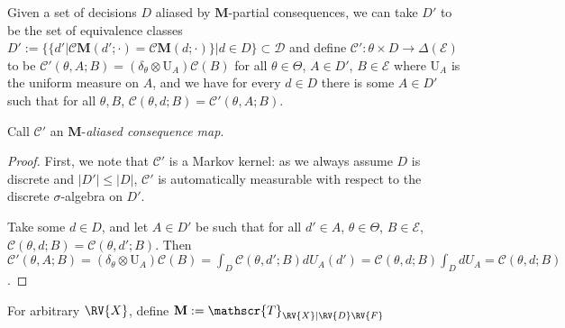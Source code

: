\begin{lemma}{\label{lem:essential_decision}}
Given a set of decisions $D$ aliased by $\mathbf{M}$-partial consequences, we can take $D'$ to be the set of equivalence classes $D':=\{\{d'|\mathscr{C}\mathbf{M}(d';\cdot)=\mathscr{C}\mathbf{M}(d;\cdot)\}|d\in D\}\subset \mathcal{D}$ and define $\mathscr{C}':\theta\times D\to \Delta(\mathcal{E})$ to be $\mathscr{C}'(\theta,A;B) = (\delta_\theta\otimes \mathrm{U}_{A})\mathscr{C}(B)$ for all $\theta\in\Theta$, $A\in D'$, $B\in\mathcal{E}$ where $\mathrm{U}_A$ is the uniform measure on $A$, and we have for every $d\in D$ there is some $A\in D'$ such that for all $\theta, B$, $\mathscr{C}(\theta,d;B) = \mathscr{C}'(\theta,A;B)$.

Call $\mathscr{C}'$ an $\mathbf{M}$-\emph{aliased consequence map}.
\end{lemma}

\begin{proof}
First, we note that $\mathscr{C}'$ is a Markov kernel: as we always assume $D$ is discrete and $|D'|\leq |D|$, $\mathscr{C}'$ is automatically measurable with respect to the discrete $\sigma$-algebra on $D'$.

Take some $d\in D$, and let $A\in D'$ be such that for all $d'\in A$, $\theta\in \Theta$, $B\in \mathcal{E}$, $\mathscr{C}(\theta,d;B)=\mathscr{C}(\theta,d';B)$. Then $\mathscr{C}'(\theta,A;B)=(\delta_\theta\otimes \mathrm{U}_{A})\mathscr{C}(B) = \int_D \mathscr{C}(\theta,d';B) d U_A(d') = \mathscr{C}(\theta,d;B)\int_D dU_A = \mathscr{C}(\theta,d;B)$.
\end{proof}


\begin{theorem}\label{th:aliased_decisions}
 For arbitrary $\RV{X}$, define $\mathbf{M}:=\mathscr{T}_{\RV{X}|\RV{D}\RV{F}}$
\end{theorem}

\begin{theorem}\label{th:aliased_identification}

\end{theorem}